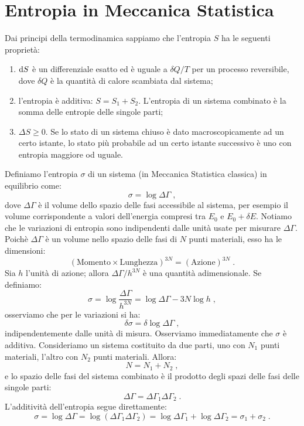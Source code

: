 \section{Entropia in Meccanica Statistica}
Dai principi della termodinamica sappiamo che l'entropia $S$ ha le seguenti proprietà:
\begin{enumerate}
 \item $\mathrm{d}{S}$ è un differenziale esatto ed è uguale a $\delta Q/T$ per un processo reversibile, dove $\delta Q$ è la quantità di calore 
 scambiata dal sistema;
 \item l'entropia è additiva: $S=S_1+S_2$. L'entropia di un sistema combinato è la somma delle entropie delle singole parti;
 \item $\Delta S\ge 0$. Se lo stato di un sistema chiuso è dato macroscopicamente ad un certo istante, lo stato più probabile ad un 
 certo istante successivo è uno con entropia maggiore od uguale.
 \end{enumerate}
Definiamo l'entropia $\sigma$ di un sistema (in Meccanica Statistica classica) in equilibrio come:
\begin{equation}
 \sigma=\log \Delta\Gamma\;,
\end{equation}
dove $\Delta\Gamma$ è il volume dello spazio delle fasi accessibile al sistema, per esempio il volume corrispondente a valori dell'energia compresi tra $E_0$ e $E_0+\delta E$. Notiamo che le variazioni di entropia sono indipendenti dalle unità usate per misurare 
$\Delta\Gamma$. Poichè $\Delta\Gamma$ è un volume nello spazio delle fasi di $N$ punti materiali, esso ha le dimensioni:
$$
(\mbox{Momento}\times \mbox{Lunghezza})^{3N}=(\mbox{Azione})^{3N}\;.
$$
Sia $h$ l'unità di azione; allora $\Delta\Gamma/h^{3N}$ è una quantità adimensionale. Se definiamo:
\begin{equation}
 \sigma=\log\frac{\Delta\Gamma}{h^{3N}}=\log\Delta\Gamma-3N\log h\;,
\end{equation}
osserviamo che per le variazioni si ha:
\begin{equation}
 \delta\sigma=\delta\log\Delta\Gamma\;,
\end{equation}
indipendentemente dalle unità di misura. Osserviamo immediatamente che $\sigma$ è additiva. Consideriamo un sistema costituito da due parti, uno con $N_1$ punti materiali, l'altro con $N_2$ punti materiali. Allora:
\begin{equation}
N=N_1+N_2\;,
\end{equation}
e lo spazio delle fasi del sistema combinato è il prodotto degli spazi delle fasi delle singole parti:
\begin{equation}
 \Delta\Gamma=\Delta\Gamma_1\Delta\Gamma_2\;.
\end{equation}
L'additività dell'entropia segue direttamente:
\begin{equation}
 \sigma=\log\Delta\Gamma=\log(\Delta\Gamma_1\Delta\Gamma_2)=\log\Delta\Gamma_1+\log\Delta\Gamma_2=\sigma_1+\sigma_2\;.
\end{equation}
\pagebreak
